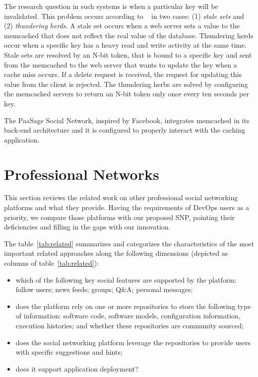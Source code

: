 The research question in such systems is when a particular key will be invalidated. This problem occurs according to ~\cite{nishtala2013scaling} in two cases: (1) \emph{stale sets} and (2) \emph{thundering herds}. A stale set occurs when a web server sets a value to the memcached that does not reflect the real value of the database. Thundering herds occur when a specific key has a heavy read and write activity at the same time. Stale sets are resolved by an N-bit token, that is bound to a specific key and sent from the memcached to the web server that wants to update the key when a cache miss occurs. If a delete request is received, the request for updating this value from the client is rejected. The thundering herbs are solved by configuring the memcached servers to return an N-bit token only once every ten seconds per key.

The PaaSage Social Network, inspired by Facebook, integrates memcached in its back-end architecture and it is configured to properly interact with the caching application.

\section{Professional Networks} 
\label{sec:networks_rel}
This section reviews the related work on other professional social networking platforms and what they provide. Having the requirements of DevOps users as a priority, we compare those platforms with our proposed SNP, pointing their deficiencies and filling in the gaps with our innovation. 

The table~\ref{tab:related} summarizes
and categorizes the characteristics of the most important related approaches along the following dimensions
(depicted as columns of table~\ref{tab:related}): 
\begin{itemize}
\item which of the following key social features are supported by the platform: follow
users; news feeds; groups; Q\&A; personal messages;
\item does the platform rely on one or more repositories
to store the following type of information: software code,
software models, configuration information, execution
histories; and whether these repositories are community sourced;
\item does the social networking platform leverage
the repositories to provide users with specific suggestions
and hints; 
\item does it support application deployment?
\end{itemize}

